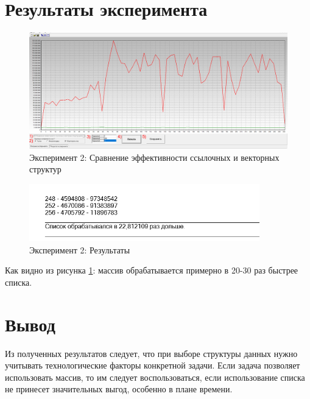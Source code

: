 \section{Результаты эксперимента}
\begin{figure}[ht!]
    \centering
    \includegraphics[width=170mm]{./img/2.png}
    \caption{Эксперимент 2: Сравнение эффективности ссылочных и векторных структур}
\end{figure}

\begin{figure}[ht!]
    \centering
    \includegraphics[width=100mm]{./img/02.png}
    \caption{Эксперимент 2: Результаты}
    \label{res_02}
\end{figure}

Как видно из рисунка \ref{res_02}: массив обрабатывается примерно в 20-30 раз быстрее списка.

\section{Вывод}
Из полученных результатов следует, что при выборе структуры данных нужно учитывать технологические факторы конкретной задачи. 
Если задача позволяет использовать массив, то им следует воспользоваться, если использование списка не принесет значительных выгод, особенно в плане времени.